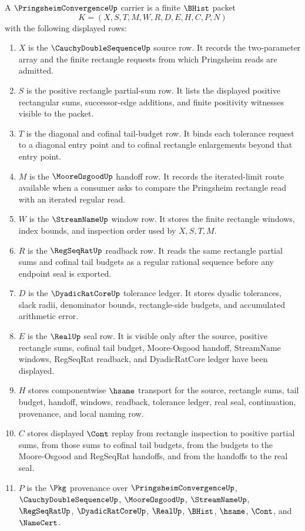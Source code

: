 \begin{definition}
\label{def:pringsheim-convergence-carrier}
A $\PringsheimConvergenceUp$ carrier is a finite $\BHist$ packet
$$
K=(X,S,T,M,W,R,D,E,H,C,P,N)
$$
with the following displayed rows:
\begin{enumerate}
\item $X$ is the $\CauchyDoubleSequenceUp$ source row. It records the two-parameter array and the finite rectangle requests from which Pringsheim reads are admitted.
\item $S$ is the positive rectangle partial-sum row. It lists the displayed positive rectangular sums, successor-edge additions, and finite positivity witnesses visible to the packet.
\item $T$ is the diagonal and cofinal tail-budget row. It binds each tolerance request to a diagonal entry point and to cofinal rectangle enlargements beyond that entry point.
\item $M$ is the $\MooreOsgoodUp$ handoff row. It records the iterated-limit route available when a consumer asks to compare the Pringsheim rectangle read with an iterated regular read.
\item $W$ is the $\StreamNameUp$ window row. It stores the finite rectangle windows, index bounds, and inspection order used by $X,S,T,M$.
\item $R$ is the $\RegSeqRatUp$ readback row. It reads the same rectangle partial sums and cofinal tail budgets as a regular rational sequence before any endpoint seal is exported.
\item $D$ is the $\DyadicRatCoreUp$ tolerance ledger. It stores dyadic tolerances, slack radii, denominator bounds, rectangle-side budgets, and accumulated arithmetic error.
\item $E$ is the $\RealUp$ seal row. It is visible only after the source, positive rectangle sums, cofinal tail budget, Moore-Osgood handoff, StreamName windows, RegSeqRat readback, and DyadicRatCore ledger have been displayed.
\item $H$ stores componentwise $\hsame$ transport for the source, rectangle sums, tail budget, handoff, windows, readback, tolerance ledger, real seal, continuation, provenance, and local naming row.
\item $C$ stores displayed $\Cont$ replay from rectangle inspection to positive partial sums, from those sums to cofinal tail budgets, from the budgets to the Moore-Osgood and RegSeqRat handoffs, and from the handoffs to the real seal.
\item $P$ is the $\Pkg$ provenance over $\PringsheimConvergenceUp$, $\CauchyDoubleSequenceUp$, $\MooreOsgoodUp$, $\StreamNameUp$, $\RegSeqRatUp$, $\DyadicRatCoreUp$, $\RealUp$, $\BHist$, $\hsame$, $\Cont$, and $\NameCert$.

\end{enumerate}
\end{definition}

